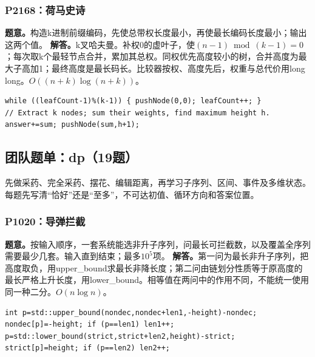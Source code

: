 \subsubsection{P2168：荷马史诗}
\textbf{题意。}构造k进制前缀编码，先使总带权长度最小，再使最长编码长度最小；输出这两个值。
\textbf{解答。}k叉哈夫曼。补权0的虚叶子，使$(n-1)\bmod(k-1)=0$；每次取k个最轻节点合并，累加其总权。同权优先高度较小的树，合并高度为最大子高加1；最终高度是最长码长。比较器按权、高度先后，权重与总代价用long long。$O((n+k)\log(n+k))$。
\begin{lstlisting}
while ((leafCount-1)%(k-1)) { pushNode(0,0); leafCount++; }
// Extract k nodes; sum their weights, find maximum height h.
answer+=sum; pushNode(sum,h+1);
\end{lstlisting}

\subsection{团队题单：dp（19题）}
先做采药、完全采药、摆花、编辑距离，再学习子序列、区间、事件及多维状态。每题先写清“恰好”还是“至多”，不可达初值、循环方向和答案位置。

\subsubsection{P1020：导弹拦截}
\textbf{题意。}按输入顺序，一套系统能选非升子序列，问最长可拦截数，以及覆盖全序列需要最少几套。输入直到结束；最多$10^5$项。
\textbf{解答。}第一问为最长非升子序列，把高度取负，用upper\_bound求最长非降长度；第二问由链划分性质等于原高度的最长严格上升长度，用lower\_bound。相等值在两问中的作用不同，不能统一使用同一种二分。$O(n\log n)$。
\begin{lstlisting}
int p=std::upper_bound(nondec,nondec+len1,-height)-nondec;
nondec[p]=-height; if (p==len1) len1++;
p=std::lower_bound(strict,strict+len2,height)-strict;
strict[p]=height; if (p==len2) len2++;
\end{lstlisting}

